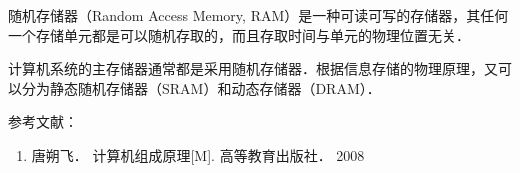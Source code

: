 
\begin{issues}
\issueDraft
\end{issues}

随机存储器（Random Access Memory, RAM）是一种可读可写的存储器，其任何一个存储单元都是可以随机存取的，而且存取时间与单元的物理位置无关．

计算机系统的主存储器通常都是采用随机存储器．根据信息存储的物理原理，又可以分为静态随机存储器（SRAM）和动态存储器（DRAM）．


参考文献：
\begin{enumerate}
\item 唐朔飞． 计算机组成原理[M]. 高等教育出版社． 2008
\end{enumerate}